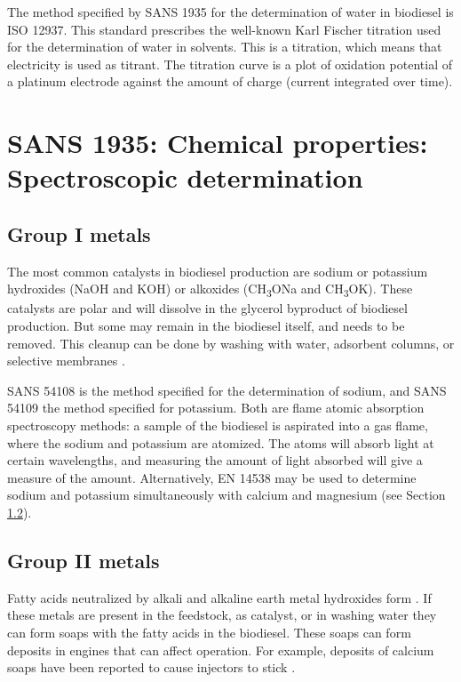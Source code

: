 The method specified by SANS 1935 for the determination of water in biodiesel is
ISO 12937. This standard prescribes the well-known Karl Fischer titration used
for the determination of water in solvents. This is a 
titration, which means that electricity is used as titrant. The titration curve
is a plot of oxidation potential of a platinum electrode against the amount of
charge (current integrated over time). 



\section{SANS 1935: Chemical properties: Spectroscopic determination}

\subsection{Group I metals}

The most common catalysts in biodiesel production are sodium or potassium
hydroxides (NaOH and KOH) or alkoxides (CH\textsubscript{3}ONa and
CH\textsubscript{3}OK). These catalysts are polar and will dissolve in the
glycerol byproduct of biodiesel production. But some may remain in the biodiesel
itself, and needs to be removed. This cleanup can be done by washing with water,
adsorbent columns, or selective membranes \autocite{Atadashi2011}.

SANS 54108 is the method specified for the determination of sodium, and SANS
54109 the method specified for potassium. Both are flame atomic absorption
spectroscopy methods: a sample of the biodiesel is aspirated into a gas flame,
where the sodium and potassium are atomized. The atoms will absorb light at
certain wavelengths, and measuring the amount of light absorbed will give a
measure of the amount. Alternatively, EN 14538 may be used to determine sodium
and potassium simultaneously with calcium and magnesium (see Section
\ref{sec:GroupIIMetals}).

\subsection{Group II metals}
\label{sec:GroupIIMetals}

Fatty acids neutralized by alkali and alkaline earth metal hydroxides form
. If these metals are present in the feedstock, as catalyst, or
in washing water they can form soaps with the fatty acids in the biodiesel.
These soaps can form deposits in engines that can affect operation. For
example, deposits of calcium soaps have been reported to cause injectors to
stick \autocite{Pischinger2000}.

